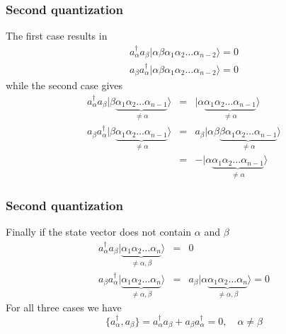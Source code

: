 \documentclass{beamer}
\begin{document}
\begin{frame}
\frametitle{Second quantization}

\begin{block}{}
The first case results in
\begin{eqnarray}
	a_\alpha^{\dagger} a_\beta |\alpha\beta\alpha_1\alpha_2 \dots \alpha_{n-2}\rangle = 0 \nonumber \\
	a_\beta a_\alpha^{\dagger} |\alpha\beta\alpha_1\alpha_2 \dots \alpha_{n-2}\rangle = 0 \label{eq:2-18a}
\end{eqnarray}
while the second case gives
\begin{eqnarray}
	 a_\alpha^{\dagger} a_\beta |\beta \underbrace{\alpha_1\alpha_2 \dots \alpha_{n-1}}_{\neq \alpha}\rangle &=& 
	 	|\alpha \underbrace{\alpha_1\alpha_2 \dots \alpha_{n-1}}_{\neq  \alpha}\rangle \nonumber \\
	a_\beta a_\alpha^{\dagger} |\beta \underbrace{\alpha_1\alpha_2 \dots \alpha_{n-1}}_{\neq \alpha}\rangle &=&
		a_\beta |\alpha\beta\underbrace{\beta \alpha_1\alpha_2 \dots \alpha_{n-1}}_{\neq \alpha}\rangle \nonumber \\
	&=& - |\alpha\underbrace{\alpha_1\alpha_2 \dots \alpha_{n-1}}_{\neq \alpha}\rangle \label{eq:2-18b}
\end{eqnarray}
\end{block}
\end{frame}

\begin{frame}
\frametitle{Second quantization}

\begin{block}{}
Finally if the state vector does not contain $\alpha$ and $\beta$
\begin{eqnarray}
	a_\alpha^{\dagger} a_\beta |\underbrace{\alpha_1\alpha_2 \dots \alpha_{n}}_{\neq \alpha,\beta}\rangle &=& 0 \nonumber \\
	a_\beta a_\alpha^{\dagger} |\underbrace{\alpha_1\alpha_2 \dots \alpha_{n}}_{\neq \alpha,\beta}\rangle &=& 
		a_\beta |\alpha \underbrace{\alpha_1\alpha_2 \dots \alpha_{n}}_{\neq \alpha,\beta}\rangle = 0 \label{eq:2-18c}
\end{eqnarray}
For all three cases we have
\begin{equation}
	\{a_\alpha^{\dagger},a_\beta \} = a_\alpha^{\dagger} a_\beta + a_\beta a_\alpha^{\dagger} = 0, \quad \alpha \neq \beta \label{eq:2-19}
\end{equation}
\end{block}
\end{frame}
\end{document}
